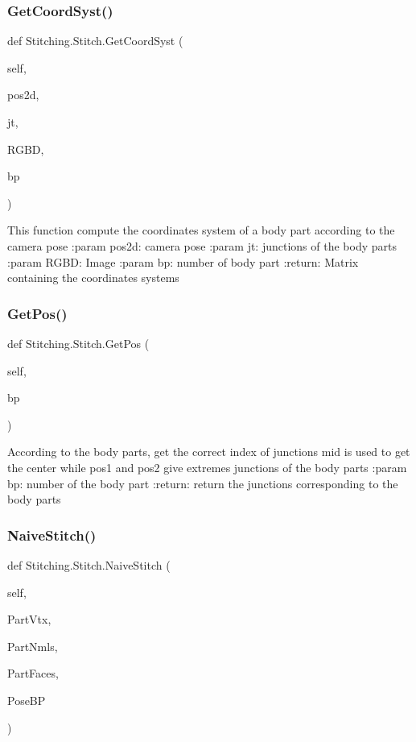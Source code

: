\subsubsection{Get\+Coord\+Syst()}
{\footnotesize\ttfamily def Stitching.\+Stitch.\+Get\+Coord\+Syst (\begin{DoxyParamCaption}\item[{}]{self,  }\item[{}]{pos2d,  }\item[{}]{jt,  }\item[{}]{R\+G\+BD,  }\item[{}]{bp }\end{DoxyParamCaption})}

\begin{DoxyVerb}This function compute the coordinates system of a body part according to the camera pose
:param pos2d: camera pose
:param jt: junctions of the body parts
:param RGBD: Image
:param bp: number of body part
:return: Matrix containing the coordinates systems
\end{DoxyVerb}
 \mbox{\label{class_stitching_1_1_stitch_a0ba4c013f984b9b0fa636a2d120094d2}} 
\subsubsection{Get\+Pos()}
{\footnotesize\ttfamily def Stitching.\+Stitch.\+Get\+Pos (\begin{DoxyParamCaption}\item[{}]{self,  }\item[{}]{bp }\end{DoxyParamCaption})}

\begin{DoxyVerb}According to the body parts, get the correct index of junctions
mid is used to get the center while pos1 and pos2 give extremes junctions of the body parts
:param bp: number of the body part
:return: return the junctions corresponding to the body parts
\end{DoxyVerb}
 \mbox{\label{class_stitching_1_1_stitch_ac88004e122bb16c19ef3038d856be04a}} 
\subsubsection{Naive\+Stitch()}
{\footnotesize\ttfamily def Stitching.\+Stitch.\+Naive\+Stitch (\begin{DoxyParamCaption}\item[{}]{self,  }\item[{}]{Part\+Vtx,  }\item[{}]{Part\+Nmls,  }\item[{}]{Part\+Faces,  }\item[{}]{Pose\+BP }\end{DoxyParamCaption})}

